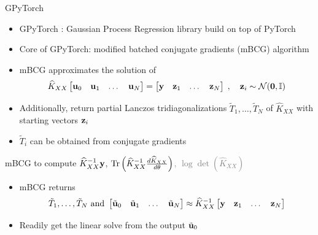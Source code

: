 \documentclass{beamer}
\begin{document}
\begin{frame}{GPyTorch}
\begin{itemize}[<+->]
    \item GPyTorch \cite{gardner_gpytorch_2021}: Gaussian Process Regression library build on top of PyTorch
    \item Core of GPyTorch: modified batched conjugate gradients (mBCG) algorithm
    \item mBCG approximates the solution of 
    \begin{equation*}
    \widehat K_{XX} \begin{bmatrix} \vect u_0 & \vect u_1 & \dots & \vect u_N \end{bmatrix} = 
    \begin{bmatrix} \vect y & \vect z_1 & \dots & \vect z_N \end{bmatrix} \; ,
    \quad \vect z_i \sim \mathcal N(\vect 0, \Id)
    \end{equation*}
    \item Additionally, return partial Lanczos tridiagonalizations $\tilde T_1, \ldots, \tilde T_N$ of $\widehat K_{XX}$ with starting vectors $\boldsymbol{\mathbf{z}}_i$
    \item $\tilde T_i$ can be obtained from conjugate gradients
\end{itemize}
\end{frame}

\begin{frame}{mBCG to compute {\normalsize $\widehat K_{XX}^{-1} \boldsymbol{\mathbf{y}}$},  \textcolor{gray}{\normalsize{$\operatorname{Tr} \left(\widehat K_{XX}^{-1} \frac{d \widehat K_{XX}}{d\theta} \right)$, $\log\det( \widehat K_{XX} )$}}}
\begin{itemize}[<+->]
    \item mBCG returns
    \begin{equation*}
        \tilde T_1, \ldots, \tilde T_N \text{ and } \begin{bmatrix} \tilde{\boldsymbol{\mathbf{u}}}_0 & \tilde{\boldsymbol{\mathbf{u}}}_1 & \dots & \tilde{\boldsymbol{\mathbf{u}}}_N \end{bmatrix} \approx 
    \widehat K_{XX}^{-1} \begin{bmatrix} \boldsymbol{\mathbf{y}} & \boldsymbol{\mathbf{z}}_1 & \dots & \boldsymbol{\mathbf{z}}_N \end{bmatrix}
    \end{equation*}
    \item Readily get the linear solve from the output $\tilde{\boldsymbol{\mathbf{u}}}_0$
\end{itemize}
\end{frame}
\end{document}
